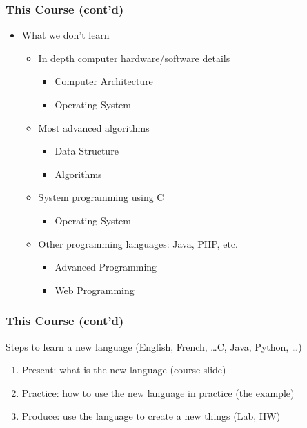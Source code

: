 \documentclass{../c-lecture}
\begin{document}
\begin{frame}
  \frametitle{This Course (cont’d)}
  \begin{itemize}
    \item What we don’t learn
    \begin{itemize}
      \item In depth computer hardware/software details
      \begin{itemize}
        \color{Aquamarine}
        \item Computer Architecture
        \item Operating System
      \end{itemize}
      \pause%
      \item Most advanced algorithms
      \begin{itemize}
        \color{Aquamarine}
        \item Data Structure
        \item Algorithms
      \end{itemize}
      \pause%
      \item System programming using C
      \begin{itemize}
        \color{Aquamarine}
        \item Operating System
      \end{itemize}
      \pause%
      \item Other programming languages: Java, PHP, etc.
      \begin{itemize}
        \color{Aquamarine}
        \item Advanced Programming
        \item Web Programming
      \end{itemize}
    \end{itemize}
  \end{itemize}
\end{frame}

\begin{frame}
  \frametitle{This Course (cont'd)}
  Steps to learn a new language (English, French, \ldots C, Java, Python, \ldots)

  \begin{enumerate}
    \item Present: what is the new language (course slide)
    \item Practice: how to use the new language in practice (the example)
    \item Produce: use the language to create a new things (Lab, HW)
  \end{enumerate}
\end{frame}
\end{document}
